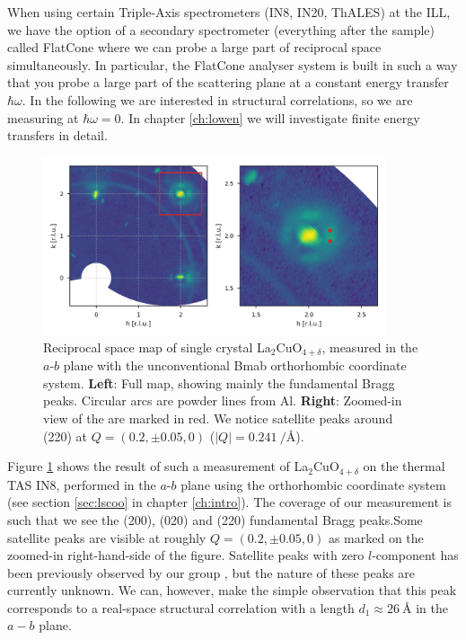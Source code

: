 When using certain Triple-Axis spectrometers (IN8, IN20, ThALES) at the ILL, we have the option of a secondary spectrometer (everything after the sample) called FlatCone \cite{flatcone} where we can probe a large part of reciprocal space simultaneously. In particular, the FlatCone analyser system is built in such a way that you probe a large part of the scattering plane at a constant energy transfer $\hbar\omega$. In the following we are interested in structural correlations, so we are measuring at $\hbar\omega = 0$. In chapter \ref{ch:lowen} we will investigate finite energy transfers in detail.

\begin{figure}
    \centering
    \includegraphics[width=0.9\textwidth]{fig/pdf/lcoo_ab_elastic.png}
    \caption{Reciprocal space map of single crystal La$_2$CuO$_{4+\delta}$, measured in the $a$-$b$ plane with the unconventional Bmab orthorhombic coordinate system. \textbf{Left}: Full map, showing mainly the fundamental Bragg peaks. Circular arcs are powder lines from Al. \textbf{Right}: Zoomed-in view of the are marked in red. We notice satellite peaks around (220) at $Q=(0.2,\pm 0.05,0)$ ($|Q| = \SI{0.241}{\per\angstrom}$).}
    \label{fig:lcoo_ab_elastic}
\end{figure}

Figure \ref{fig:lcoo_ab_elastic} shows the result of such a measurement of La$_2$CuO$_{4+\delta}$ on the thermal TAS IN8, performed in the $a$-$b$ plane using the orthorhombic coordinate system (see section \ref{sec:lscoo} in chapter \ref{ch:intro}). The coverage of our measurement is such that we see the (200), (020) and (220) fundamental Bragg peaks.Some satellite peaks are visible at roughly $Q = (0.2, \pm 0.05, 0)$ as marked on the zoomed-in right-hand-side of the figure. Satellite peaks with zero $l$-component has been previously observed by our group \cite{Ray2016}, but the nature of these peaks are currently unknown. We can, however, make the simple observation that this peak corresponds to a real-space structural correlation with a length $d_1 \approx \SI{26}{\angstrom}$ in the $a-b$ plane.

